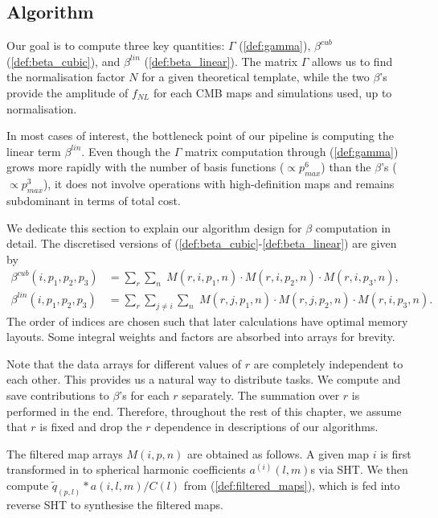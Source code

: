\subsection{Algorithm}

Our goal is to compute three key quantities: $\Gamma$ (\ref{def:gamma}), $\beta^{cub}$ (\ref{def:beta_cubic}), and $\beta^{lin}$ (\ref{def:beta_linear}). The matrix $\Gamma$ allows us to find the normalisation factor $N$ for a given theoretical template, while the two $\beta$'s provide the amplitude of $f_{NL}$ for each CMB maps and simulations used, up to normalisation.

In most cases of interest, the bottleneck point of our pipeline is computing the linear term $\beta^{lin}$. Even though the $\Gamma$ matrix computation through (\ref{def:gamma}) grows more rapidly with the number of basis functions ($\propto p_{max}^6$) than the $\beta$'s ($\propto p_{max}^3$), it does not involve operations with high-definition maps and remains subdominant in terms of total cost.

We dedicate this section to explain our algorithm design for $\beta$ computation in detail. The discretised versions of (\ref{def:beta_cubic}-\ref{def:beta_linear}) are given by
\begin{align}
	\beta^{cub}(i, p_1,p_2,p_3) &= \sum_r \sum_n \; M(r, i, p_1, n) \cdot M(r, i, p_2, n) \cdot M(r, i, p_3, n), \\
	\beta^{lin}(i, p_1,p_2,p_3) &= \sum_r \sum_{j \neq i} \sum_n \; M(r, j, p_1, n) \cdot M(r, j, p_2, n) \cdot M(r, i, p_3, n).
\end{align}
The order of indices are chosen such that later calculations have optimal memory layouts. Some integral weights and factors are absorbed into arrays for brevity.

Note that the data arrays for different values of $r$ are completely independent to each other. This provides us a natural way to distribute tasks. We compute and save contributions to $\beta$'s for each $r$ separately. The summation over $r$ is performed in the end. Therefore, throughout the rest of this chapter, we assume that $r$ is fixed and drop the $r$ dependence in descriptions of our algorithms.

The filtered map arrays $M(i,p,n)$ are obtained as follows. A given map $i$ is first transformed in to spherical harmonic coefficients $a^{(i)}(l,m)$s via SHT. We then compute $\tilde{q}_(p,l) * a(i,l,m) / C(l)$ from (\ref{def:filtered_maps}), which is fed into reverse SHT to synthesise the filtered maps.

